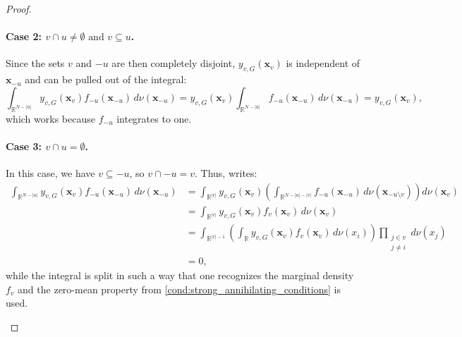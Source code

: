 \begin{proof}
\paragraph{Case 2: $v \cap u \ne \emptyset \text{ and } v \subseteq u$.}
Since the sets $v$ and $-u$ are then completely disjoint, $y_{v,G}(\boldsymbol{x}_v)$ is independent of $\boldsymbol{x}_{-u}$ and can be pulled out of the integral:
\[
\int_{\mathbb{R}^{N - |u|}} y_{v,G}(\boldsymbol{x}_v) f_{-u}(\boldsymbol{x}_{-u}) \, d \nu(\boldsymbol{x}_{-u})
= y_{v,G}(\boldsymbol{x}_v) \int_{\mathbb{R}^{N - |u|}} f_{-u}(\boldsymbol{x}_{-u}) \, d \nu(\boldsymbol{x}_{-u})
= y_{v,G}(\boldsymbol{x}_v),
\]
which works because $f_{-u}$ integrates to one.
\begin{center}
\end{center}
\paragraph{Case 3: \( v \cap u = \emptyset \).}
In this case, we have \( v \subseteq -u \), so \( v \cap -u = v \). Thus, \citet{rahman2014} writes:
\[
\begin{aligned}
\int_{\mathbb{R}^{N - |u|}} y_{v,G}(\boldsymbol{x}_v) f_{-u}(\boldsymbol{x}_{-u}) \, d \nu(\boldsymbol{x}_{-u})
&= \int_{\mathbb{R}^{|v|}} y_{v,G}(\boldsymbol{x}_v)
\left( \int_{\mathbb{R}^{N - |u| - |v|}} f_{-u}(\boldsymbol{x}_{-u}) \, d \nu(\boldsymbol{x}_{-u \setminus v}) \right)
d \nu(\boldsymbol{x}_v) \\[3ex]
&= \int_{\mathbb{R}^{|v|}} y_{v,G}(\boldsymbol{x}_v) f_v(\boldsymbol{x}_v) \, d \nu(\boldsymbol{x}_v) \\[3ex]
&= \int_{\mathbb{R}^{|v|-1}} \left( \int_{\mathbb{R}} y_{v,G}(\boldsymbol{x}_v) f_v(\boldsymbol{x}_v) \, d \nu(x_i) \right)
\prod_{\substack{j \in v \\ j \ne i}} d \nu (x_j) \\
&= 0,
\end{aligned}
\]
while the integral is split in such a way that one recognizes the marginal density $f_v$ and the zero-mean property from \autoref{cond:strong_annihilating_conditions} is used.
\begin{center}
\end{center}
\end{proof}
